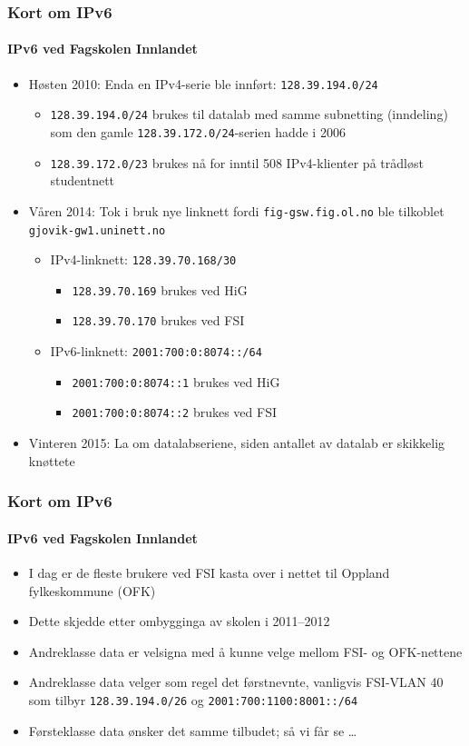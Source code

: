 \begin{frame}%
  \frametitle{Kort om IPv6}
  \framesubtitle{IPv6 ved Fagskolen Innlandet}
  \begin{itemize}[<+->]
  \item Høsten 2010: Enda en IPv4-serie ble innført:
    \texttt{128.39.194.0/24}
    \begin{itemize}[<+->]
    \item \texttt{128.39.194.0/24} brukes til datalab med samme
      subnetting (inndeling) som den gamle
      \texttt{128.39.172.0/24}-serien hadde i 2006
    \item \texttt{128.39.172.0/\alert{23}} brukes nå for inntil 508
      IPv4-klienter på trådløst studentnett
    \end{itemize}
  \item Våren 2014: Tok i bruk nye linknett fordi
    \texttt{fig-gsw.fig.ol.no} ble tilkoblet
    \texttt{gjovik-gw1.uninett.no}
    \begin{itemize}[<+->]
    \item IPv4-linknett: \texttt{128.39.70.168/30}
      \begin{itemize}[<+->]
      \item \texttt{128.39.70.169} brukes ved HiG
      \item \texttt{128.39.70.170} brukes ved FSI
      \end{itemize}
    \item IPv6-linknett: \texttt{2001:700:0:8074::/64}
      \begin{itemize}[<+->]
      \item \texttt{2001:700:0:8074::1} brukes ved HiG
      \item \texttt{2001:700:0:8074::2} brukes ved FSI
      \end{itemize}
    \end{itemize}
  \item Vinteren 2015: La om datalabseriene, siden antallet av datalab
    er skikkelig knøttete
  \end{itemize}
\end{frame}

\begin{frame}%
  \frametitle{Kort om IPv6}
  \framesubtitle{IPv6 ved Fagskolen Innlandet}
  \begin{itemize}[<+->]
  \item I dag er de fleste brukere ved FSI kasta over i nettet til
    Oppland fylkeskommune (OFK)
  \item Dette skjedde etter ombygginga av skolen i 2011--2012
  \item Andreklasse data er velsigna med å kunne velge mellom FSI- og
    OFK-nettene
  \item Andreklasse data velger som regel det førstnevnte, vanligvis
    FSI-VLAN 40 som tilbyr \texttt{128.39.194.0/26} og
    \texttt{2001:700:1100:8001::/64}
  \item Førsteklasse data ønsker det samme tilbudet; så vi får se \dots
  \end{itemize}
\end{frame}

